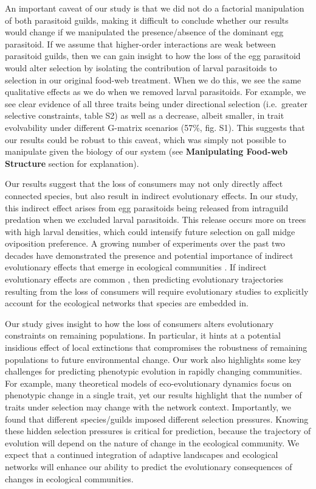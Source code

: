 \documentclass[11pt,]{article}
\begin{document}
An important caveat of our study is that we did not do a factorial
manipulation of both parasitoid guilds, making it difficult to conclude
whether our results would change if we manipulated the presence/absence
of the dominant egg parasitoid. If we assume that higher-order
interactions \citep{Levine2017} are weak between parasitoid guilds, then
we can gain insight to how the loss of the egg parasitoid would alter
selection by isolating the contribution of larval parasitoids to
selection in our original food-web treatment. When we do this, we see
the same qualitative effects as we do when we removed larval
parasitoids. For example, we see clear evidence of all three traits
being under directional selection (i.e.~greater selective constraints,
table S2) as well as a decrease, albeit smaller, in trait evolvability
under different G-matrix scenarios (57\%, fig. S1). This suggests that
our results could be robust to this caveat, which was simply not
possible to manipulate given the biology of our system (see
\textbf{Manipulating Food-web Structure} section for explanation).

Our results suggest that the loss of consumers may not only directly
affect connected species, but also result in indirect evolutionary
effects. In our study, this indirect effect arises from egg parasitoids
being released from intraguild predation when we excluded larval
parasitoids. This release occurs more on trees with high larval
densities, which could intensify future selection on gall midge
oviposition preference. A growing number of experiments over the past
two decades have demonstrated the presence and potential importance of
indirect evolutionary effects that emerge in ecological communities
\citep{Pilson1996, Juenger1998, Stinchcombe2001, Lankau2007, Walsh2008, Walsh2010, terHorst2010, Sahli2011, Lau2012, terHorst2015, Schiestl2018, Start2019}.
If indirect evolutionary effects are common
\citep{Miller1996, Walsh2013, Guimaraes2017}, then predicting
evolutionary trajectories resulting from the loss of consumers will
require evolutionary studies to explicitly account for the ecological
networks that species are embedded in.

Our study gives insight to how the loss of consumers alters evolutionary
constraints on remaining populations. In particular, it hints at a
potential insidious effect of local extinctions that compromises the
robustness of remaining populations to future environmental change. Our
work also highlights some key challenges for predicting phenotypic
evolution in rapidly changing communities. For example, many theoretical
models of eco-evolutionary dynamics focus on phenotypic change in a
single trait, yet our results highlight that the number of traits under
selection may change with the network context. Importantly, we found
that different species/guilds imposed different selection pressures.
Knowing these hidden selection pressures is critical for prediction,
because the trajectory of evolution will depend on the nature of change
in the ecological community. We expect that a continued integration of
adaptive landscapes and ecological networks will enhance our ability to
predict the evolutionary consequences of changes in ecological
communities.
\end{document}
